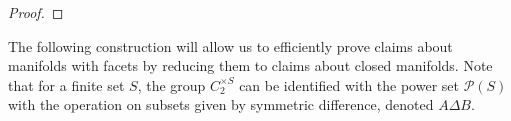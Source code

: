 \documentclass[11pt]{amsart}
\theoremstyle{definition}
\numberwithin{equation}{section}
\numberwithin{figure}{section}
\newcommand{\ti}{\widetilde}
\begin{document}
\begin{proof}
%	
%	
%	
\end{proof}

The following construction will allow us to efficiently prove claims about manifolds with facets by reducing them to claims about closed manifolds. Note that for a finite set $S$, the group $C_2^{\times S}$ can be identified with the power set $\mathcal{P}(S)$ with the operation on subsets given by symmetric difference, denoted $A\Delta B$.
\end{document}

